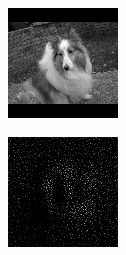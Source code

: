 \begin{figure}[H]
  \setcounter{subfigure}{0}
  \begin{subfigure}[t]{0.13\textwidth}
    \centering
    \includegraphics[width=\linewidth]{img/one-trial/stimulus_2.png}
  \end{subfigure}
  \begin{subfigure}[t]{0.13\textwidth}
    \centering
    \includegraphics[width=\linewidth]{img/one-trial/intermediate-cnnv3/intermediate_1.png}

\end{subfigure}
\end{figure}
